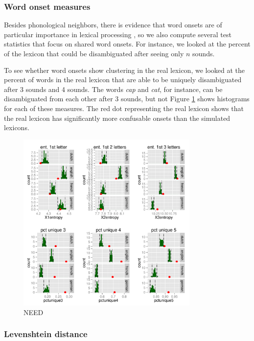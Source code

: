 \documentclass{article}
\begin{document}
\subsubsection{Word onset measures} Besides phonological neighbors, there is evidence that word onsets are of
particular importance in lexical processing \citep{marslen1980speech,marslen1987functional,wingfield1997word},
so we also compute several test statistics that focus on shared word onsets. For instance, we looked at the
percent of the lexicon that could be disambiguated after seeing only $n$ sounds.

To see whether word onsets show clustering in the real lexicon, we looked at the percent of words in the real
lexicon that are able to be uniquely disambiguated after 3 sounds and 4 sounds. The words {\em cap} and {\em
cat}, for instance, can be disambiguated from each other after 3 sounds, but not Figure \ref{3onset} shows
histograms for each of these measures. The red dot representing the real lexicon shows that the real lexicon
has significantly more confusable onsets than the simulated lexicons.


\begin{figure}
\centering \includegraphics[width=0.8\textwidth]{PDFs/onset_n5.pdf}
  \caption{NEED }
  \label{3onset}
\end{figure}

\subsubsection{Levenshtein distance}
\end{document}
